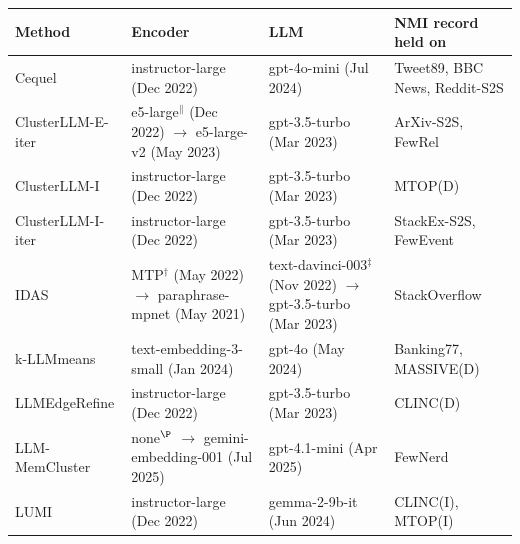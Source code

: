 \documentclass[11pt,a4paper,oneside]{report}
\begin{document}
\begin{table}[htbp]
\centering
\small
\setlength{\tabcolsep}{4pt}
\renewcommand{\cellalign}{tl}
\begin{tabularx}{\textwidth}{lll>{\raggedright\arraybackslash}X}
\toprule
Method & Encoder & LLM & NMI record held on \\
\midrule
Cequel & {\footnotesize\ttfamily instructor-large} {\footnotesize(Dec 2022)} & {\footnotesize\ttfamily gpt-4o-mini} {\footnotesize(Jul 2024)} & Tweet89, BBC News, Reddit-S2S \\
ClusterLLM-E-iter & \makecell{{\footnotesize\ttfamily e5-large}$^{\|}$ {\footnotesize(Dec 2022)} \\ $\to$ {\footnotesize\ttfamily e5-large-v2} {\footnotesize(May 2023)}} & {\footnotesize\ttfamily gpt-3.5-turbo} {\footnotesize(Mar 2023)} & ArXiv-S2S, FewRel \\
\addlinespace[2pt]
ClusterLLM-I & {\footnotesize\ttfamily instructor-large} {\footnotesize(Dec 2022)} & {\footnotesize\ttfamily gpt-3.5-turbo} {\footnotesize(Mar 2023)} & MTOP(D) \\
ClusterLLM-I-iter & {\footnotesize\ttfamily instructor-large} {\footnotesize(Dec 2022)} & {\footnotesize\ttfamily gpt-3.5-turbo} {\footnotesize(Mar 2023)} & StackEx-S2S, FewEvent \\
\addlinespace[2pt]
IDAS & \makecell{{\footnotesize\ttfamily MTP}$^{\dagger}$ {\footnotesize(May 2022)} \\ $\to$ {\footnotesize\ttfamily paraphrase-mpnet} {\footnotesize(May 2021)}} & \makecell{{\footnotesize\ttfamily text-davinci-003}$^{\ddagger}$ {\footnotesize(Nov 2022)} \\ $\to$ {\footnotesize\ttfamily gpt-3.5-turbo} {\footnotesize(Mar 2023)}} & StackOverflow \\
\addlinespace[2pt]
k-LLMmeans & {\footnotesize\ttfamily text-embedding-3-small} {\footnotesize(Jan 2024)} & {\footnotesize\ttfamily gpt-4o} {\footnotesize(May 2024)} & Banking77, MASSIVE(D) \\
LLMEdgeRefine & {\footnotesize\ttfamily instructor-large} {\footnotesize(Dec 2022)} & {\footnotesize\ttfamily gpt-3.5-turbo} {\footnotesize(Mar 2023)} & CLINC(D) \\
\addlinespace[2pt]
LLM-MemCluster & \makecell{none$^{\P}$ \\ $\to$ {\footnotesize\ttfamily gemini-embedding-001} {\footnotesize(Jul 2025)}} & {\footnotesize\ttfamily gpt-4.1-mini} {\footnotesize(Apr 2025)} & FewNerd \\
\addlinespace[2pt]
LUMI & {\footnotesize\ttfamily instructor-large} {\footnotesize(Dec 2022)} & {\footnotesize\ttfamily gemma-2-9b-it} {\footnotesize(Jun 2024)} & CLINC(I), MTOP(I) \\

\end{tabularx}
\end{table}
\end{document}
